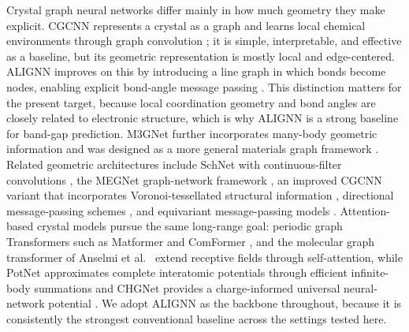 \documentclass[a4paper,11pt]{article}
\begin{document}
Crystal graph neural networks differ mainly in how much geometry they make explicit. CGCNN represents a crystal as a graph and learns local chemical environments through graph convolution \cite{xie2018cgcnn}; it is simple, interpretable, and effective as a baseline, but its geometric representation is mostly local and edge-centered. ALIGNN improves on this by introducing a line graph in which bonds become nodes, enabling explicit bond-angle message passing \cite{choudhary2021alignn}. This distinction matters for the present target, because local coordination geometry and bond angles are closely related to electronic structure, which is why ALIGNN is a strong baseline for band-gap prediction. M3GNet further incorporates many-body geometric information and was designed as a more general materials graph framework \cite{chen2022m3gnet}. Related geometric architectures include SchNet with continuous-filter convolutions \cite{schutt2018schnet}, the MEGNet graph-network framework \cite{chen2019graph}, an improved CGCNN variant that incorporates Voronoi-tessellated structural information \cite{park2020icgcnn}, directional message-passing schemes \cite{gasteiger2020dimenet,gasteiger2021gemnet}, and equivariant message-passing models \cite{schutt2021painn,batzner2022nequip,batatia2022mace}. Attention-based crystal models pursue the same long-range goal: periodic graph Transformers such as Matformer \cite{yan2022periodic} and ComFormer \cite{yan2024comformer}, and the molecular graph transformer of Anselmi et al.\ \cite{anselmi2024mgt} extend receptive fields through self-attention, while PotNet approximates complete interatomic potentials through efficient infinite-body summations \cite{lin2023potnet} and CHGNet provides a charge-informed universal neural-network potential \cite{deng2023chgnet}. We adopt ALIGNN as the backbone throughout, because it is consistently the strongest conventional baseline across the settings tested here.
\end{document}
